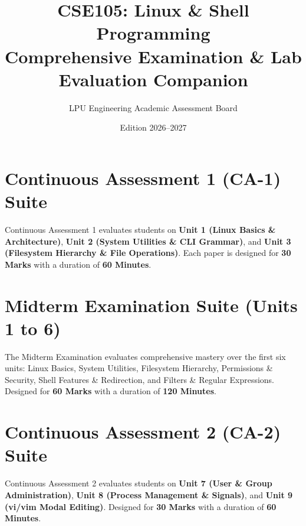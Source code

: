 \documentclass[a4paper,10pt,oneside,openany]{book}
\title{\textbf{CSE105: Linux \& Shell Programming}\\Comprehensive Examination \& Lab Evaluation Companion}
\author{LPU Engineering Academic Assessment Board}
\date{Edition 2026--2027}
\begin{document}
\frontmatter
\maketitle

\tableofcontents
\newpage

\mainmatter

\chapter{Continuous Assessment 1 (CA-1) Suite}
\label{chap:ca1}
\noindent
Continuous Assessment 1 evaluates students on \textbf{Unit 1 (Linux Basics \& Architecture)}, \textbf{Unit 2 (System Utilities \& CLI Grammar)}, and \textbf{Unit 3 (Filesystem Hierarchy \& File Operations)}. Each paper is designed for \textbf{30 Marks} with a duration of \textbf{60 Minutes}.

\newpage

\newpage


\chapter{Midterm Examination Suite (Units 1 to 6)}
\label{chap:midterm}
\noindent
The Midterm Examination evaluates comprehensive mastery over the first six units: Linux Basics, System Utilities, Filesystem Hierarchy, Permissions \& Security, Shell Features \& Redirection, and Filters \& Regular Expressions. Designed for \textbf{60 Marks} with a duration of \textbf{120 Minutes}.

\newpage

\newpage


\chapter{Continuous Assessment 2 (CA-2) Suite}
\label{chap:ca2}
\noindent
Continuous Assessment 2 evaluates students on \textbf{Unit 7 (User \& Group Administration)}, \textbf{Unit 8 (Process Management \& Signals)}, and \textbf{Unit 9 (vi/vim Modal Editing)}. Designed for \textbf{30 Marks} with a duration of \textbf{60 Minutes}.
\end{document}
